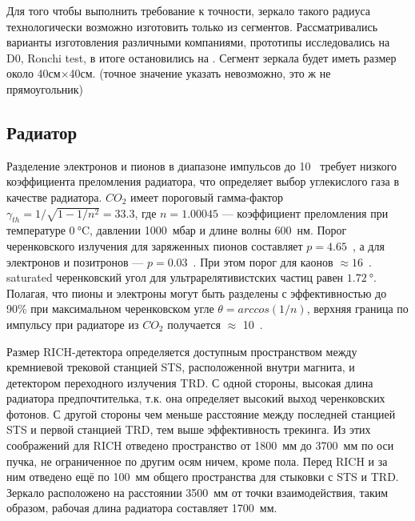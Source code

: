 Для того чтобы выполнить требование к точности, зеркало такого радиуса технологически возможно изготовить только из сегментов. Рассматривались варианты изготовления различными компаниями, прототипы исследовались на \todo D0, Ronchi test, в итоге остановились на \todo.
Сегмент зеркала будет иметь размер около 40см$\times$40см. (точное значение указать невозможно, это ж не прямоугольник)

\subsection{Радиатор}

Разделение электронов и пионов в диапазоне импульсов до 10~\GeVoverC{} требует низкого коэффициента преломления радиатора, что определяет выбор углекислого газа в качестве радиатора. $CO_{2}$ имеет пороговый гамма-фактор $\gamma _{th} = 1 / \sqrt{1 - 1/n^{2}} = 33.3$, где $n = 1.00045$ --- коэффициент преломления при температуре $\SI{0}{\degreeCelsius}$, давлении 1000~мбар и длине волны 600~нм. Порог черенковского излучения для заряженных пионов составляет $p = 4.65$~\GeVoverC, а для электронов и позитронов --- $p = 0.03$~\GeVoverC. При этом порог для каонов $\approx 16$~\GeVoverC. \todo saturated черенковский угол для ультрарелятивистских частиц равен $\SI{1.72}{\degree}$. Полагая, что пионы и электроны могут быть разделены с эффективностью до 90\% \todo при максимальном черенковском угле $\theta = arccos(1/n)$, верхняя граница по импульсу при радиаторе из $CO_{2}$ получается $\approx$ 10~\GeVoverC.


Размер RICH-детектора определяется доступным пространством между кремниевой трековой станцией STS, расположенной внутри магнита, и детектором переходного излучения TRD. С одной стороны, высокая длина радиатора предпочтителька, т.к. она определяет высокий выход черенковских фотонов. С другой стороны чем меньше расстояние между последней станцией STS и первой станцией TRD, тем выше эффективность трекинга. Из этих соображений для RICH отведено пространство от 1800~мм до 3700~мм по оси пучка, не ограниченное по другим осям ничем, кроме пола. Перед RICH и за ним отведено ещё по 100~мм общего пространства для стыковки с STS и TRD. Зеркало расположено на расстоянии 3500~мм от точки взаимодействия, таким образом, рабочая длина радиатора составляет 1700~мм.

